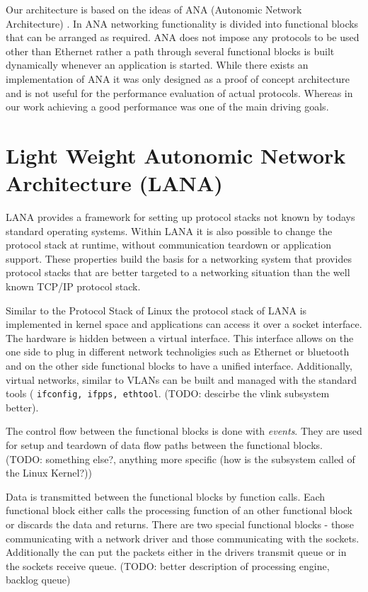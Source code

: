 \documentclass{sig-alternate}
\begin{document}
Our architecture is based on the ideas of ANA (Autonomic Network Architecture) \cite{ANAJournal}.
In ANA networking functionality is divided into functional blocks that can be arranged as required. ANA does not impose any protocols to be used other than Ethernet rather a path through several functional blocks is built dynamically whenever an application is started.   
While there exists an implementation of ANA it was only designed as a proof of concept architecture and is not useful for the performance evaluation of actual protocols. Whereas in our work achieving a good performance was one of the main driving goals. 


\section{Light Weight Autonomic Network Architecture (LANA)}
LANA provides a framework for setting up protocol stacks not known by todays standard operating systems. Within LANA it is also possible to change the protocol stack at runtime, without communication teardown or application support. These properties build the basis for a networking system that provides protocol stacks that are better targeted to a networking situation than the well known TCP/IP protocol stack.
 
Similar to the Protocol Stack of Linux the protocol stack of LANA is implemented in kernel space and applications can access it over a socket interface. The hardware is hidden between a virtual interface. This interface allows on the one side to plug in different network technoligies such as Ethernet or bluetooth and on the other side functional blocks to have a unified interface. Additionally, virtual networks, similar to VLANs can be built and managed with the standard tools ( \texttt{ifconfig, ifpps, ethtool}. (TODO: descirbe the vlink subsystem better).

The control flow between the functional blocks is done with \textit{events}. They are used for setup and teardown of data flow paths between the functional blocks. (TODO: something else?, anything more specific (how is the subsystem called of the Linux Kernel?))

Data is transmitted between the functional blocks by function calls. Each functional block either calls the processing function of an other functional block or discards the data and returns. There are two special functional blocks - those communicating with a network driver and those communicating with the sockets. Additionally the can put the packets either in the drivers transmit queue or in the sockets receive queue. (TODO: better description of processing engine, backlog queue)
\end{document}

